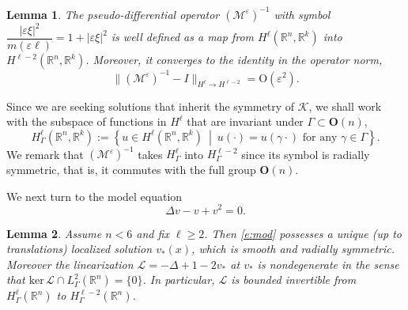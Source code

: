 \documentclass[10pt]{article}
\newtheorem{Lemma}{Lemma}[section]
\newcommand{\R}{\mathbb{R}}
\newcommand{\Ns}{\mathrm{ker\,}}
\newcommand{\rmO}{\mathrm{O}}
\newcommand{\eps}{\varepsilon}
\newcommand{\K}{\mathcal{K}}
\newcommand{\cL}{\mathcal{L}}
\newcommand{\M}{\mathcal{M}}
\renewcommand{\geq}{\geqslant}
\begin{document}
\iffalse
recall we defined \[ 
\widehat{\mathcal{M}^\eps v}(\xi) = \frac{m(\eps\xi)}{|\eps\xi|^2}\widehat{v}(\xi)=\frac{1}{1+|\eps\xi|^2} \widehat{v}(\xi). 
\] 
Since $1/(1+|\eps \xi|^2)$ is a bounded function on $\R^n$, $\M^\eps$ maps $H^\ell(\R^n,\R^k)$ into itself. And we had
\fi


\begin{Lemma}\label{estmult}The pseudo-differential operator $(\M^\eps)^{-1}$ with symbol $\dfrac{|\eps\xi|^2}{m(\eps\ell)}=1+|\eps\xi|^2 $ is well defined as a map from $H^\ell  (\R^n,\R^k)$ into $H^{\ell-2} (\R^n,\R^k)$. Moreover, it converges to the identity in the operator norm, 
\begin{equation}\label{e:precond}
\|(\M^\eps)^{-1}-I\|_{H^\ell \to H^{\ell-2}} = \rmO(\eps^2).
\end{equation}
\end{Lemma}
Since we are seeking solutions that inherit the symmetry of $\K$, we shall work with the subspace of functions in $H^\ell$ that are invariant under  $\Gamma \subset \mathbf{O}(n)$,
\[
H^\ell_{\Gamma}(\R^n,\R^k):=\left\{  u \in H^{\ell}(\R^n,\R^k) \ \middle|\    u(\cdot) = u (\gamma\cdot) \text{ for any } \gamma \in \Gamma\right\}.
\]
We remark that $(\M^\eps)^{-1}$ takes  $H^\ell_{\Gamma}$ into $H^{\ell-2}_{\Gamma}$ since its symbol is radially symmetric, that is, it commutes with the full group $\mathbf{O}(n)$.

We next turn to the model equation
\begin{equation}\label{e:mod}
\Delta v - v +v^2 = 0.
\end{equation}

\begin{Lemma}\label{nondeg}
Assume $n<6$ and fix $\ell\geq 2$.
Then \eqref{e:mod} possesses a unique (up to translations) localized solution $v_*(x)$, which is smooth and radially symmetric. Moreover  the linearization $\cL = -\Delta+1-2v_*$ at $v_*$ is nondegenerate in the  sense that  $\Ns \cL \cap L^2_{\Gamma}(\R^n) = \{0\}$. In particular, $\cL$ is bounded invertible from  $H^{\ell}_{\Gamma}(\R^n)$ to $H^{\ell-2}_{\Gamma}(\R^n)$.
\end{Lemma}
\end{document}
